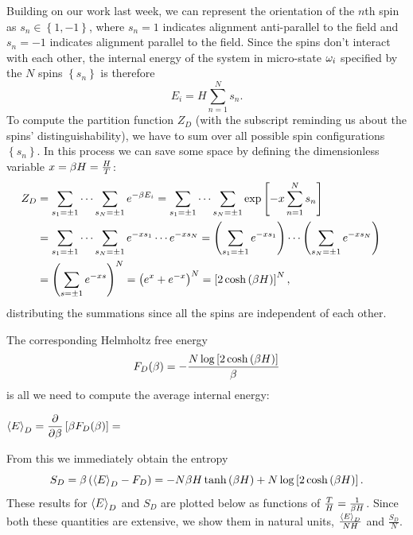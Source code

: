 Building on our work last week, we can represent the orientation of the $n$th spin as $s_n \in \left\{1, -1\right\}$, where $s_n = 1$ indicates alignment anti-parallel to the field and $s_n = -1$ indicates alignment parallel to the field.
Since the spins don't interact with each other, the internal energy of the system in micro-state $\omega_i$ specified by the $N$ spins $\left\{s_n\right\}$ is therefore
\begin{equation}
  \label{eq:spin_energy}
  E_i = H \sum_{n = 1}^N s_n.
\end{equation}
To compute the partition function $Z_D$ (with the subscript reminding us about the spins' distinguishability), we have to sum over all possible spin configurations $\left\{s_n\right\}$.
In this process we can save some space by defining the dimensionless variable $x = \beta H = \frac{H}{T}$:
\begin{align}
  Z_D & = \sum_{s_1 = \pm 1} \cdots \sum_{s_N = \pm 1} e^{-\beta E_i} = \sum_{s_1 = \pm 1} \cdots \sum_{s_N = \pm 1} \exp\left[-x \sum_{n = 1}^N s_n\right] \cr
      & = \sum_{s_1 = \pm 1} \cdots \sum_{s_N = \pm 1} e^{-x s_1} \cdots e^{-x s_N} = \left(\sum_{s_1 = \pm 1} e^{-x s_1}\right) \cdots \left(\sum_{s_N = \pm 1} e^{-x s_N}\right) \cr
      & = \left(\sum_{s = \pm 1} e^{-x s}\right)^N = \left(e^x + e^{-x}\right)^N = \left[2\cosh\left(\beta H\right)\right]^N,
\end{align}
distributing the summations since all the spins are independent of each other.

The corresponding Helmholtz free energy
\begin{equation}
  \label{eq:dist_Helm}
  F_D(\beta) = -\frac{N \log\left[2\cosh\left(\beta H\right)\right]}{\beta}
\end{equation}
is all we need to compute the average internal energy:
\begin{mdframed}
  $\displaystyle \left\langle E \right\rangle_D = \frac{\partial }{\partial \beta}\left[\beta F_D(\beta)\right] = $ \\[100 pt]
\end{mdframed}
From this we immediately obtain the entropy
\begin{equation}
  \label{eq:dist_entropy}
  S_D = \beta\left(\left\langle E \right\rangle_D - F_D\right) = -N\beta H \tanh\left(\beta H\right) + N \log\left[2\cosh\left(\beta H\right)\right].
\end{equation}
These results for $\left\langle E \right\rangle_D$ and $S_D$ are plotted below as functions of $\frac{T}{H} = \frac{1}{\beta H}$.
Since both these quantities are extensive, we show them in natural units, $\frac{\left\langle E \right\rangle_D}{NH}$ and $\frac{S_D}{N}$.

